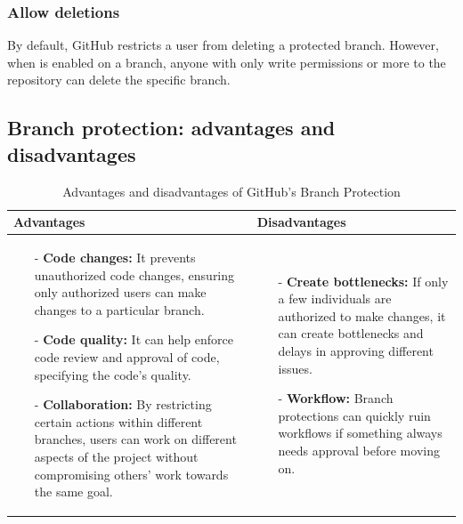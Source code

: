 \subsubsection{Allow deletions}
By default, GitHub restricts a user from deleting a protected branch. However, when  is enabled on a branch, anyone with only write permissions or more to the repository can delete the specific branch. 

\subsection{Branch protection: advantages and disadvantages}
\begin{table}[H]
\centering
\begin{tabular}{|>{\raggedright\arraybackslash}p{6cm}|>{\raggedright\arraybackslash}p{6cm}|}
\hline
\textbf{Advantages} & \textbf{Disadvantages} \\
\hline
\begin{itemize}
\item [-] \textbf{Code changes:} It prevents unauthorized code changes, ensuring only authorized users can make changes to a particular branch.
\vspace{5pt}
\item [-]\textbf{Code quality:} It can help enforce code review and approval of code, specifying the code's quality. 
\vspace{5pt}
\item [-] \textbf{Collaboration:} By restricting certain actions within different branches, users can work on different aspects of the project without compromising others' work towards the same goal.  
\end{itemize}
&
   \begin{itemize}
\item [-] \textbf{Create bottlenecks:} If only a few individuals are authorized to make changes, it can create bottlenecks and delays in approving different issues. 
\vspace{5pt}
\item [-] \textbf{Workflow:} Branch protections can quickly ruin workflows if something always needs approval before moving on. 
    \end{itemize}
    \\
    \hline
    \end{tabular}
    \caption{Advantages and disadvantages of GitHub's Branch Protection}
    \label{tab: Branch_protection}
    \end{table}
    


